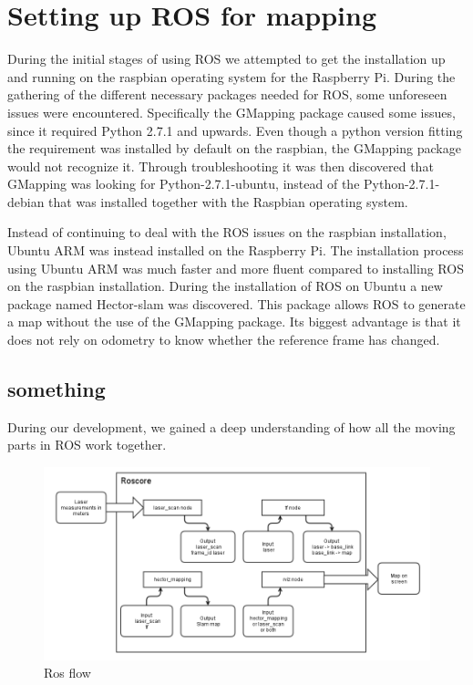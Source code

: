 \clearpage
\section{Setting up ROS for mapping}

During the initial stages of using ROS we attempted to get the installation up and running on the raspbian operating system for the Raspberry Pi. During the gathering of the different necessary packages needed for ROS, some unforeseen issues were encountered. Specifically the GMapping package caused some issues, since it required Python 2.7.1 and upwards. Even though a python version fitting the requirement was installed by default on the raspbian, the GMapping package would not recognize it. Through troubleshooting it was then discovered that GMapping was looking for Python-2.7.1-ubuntu, instead of the Python-2.7.1-debian that was installed together with the Raspbian operating system.

Instead of continuing to deal with the ROS issues on the raspbian installation, Ubuntu ARM was instead installed on the Raspberry Pi.
The installation process using Ubuntu ARM was much faster and more fluent compared to installing ROS on the raspbian installation. During the installation of ROS on Ubuntu a new package named Hector-slam was discovered. 
This package allows ROS to generate a map without the use of the GMapping package. Its biggest advantage is that it does not rely on odometry to know whether the reference frame has changed.

\subsection{something}
During our development, we gained a deep understanding of how all the moving parts in ROS work together.


\begin{figure}[H]
	\centering
	\includegraphics[width=.8\linewidth]{images/ROSflow.png}
	\caption{Ros flow}
\end{figure}

